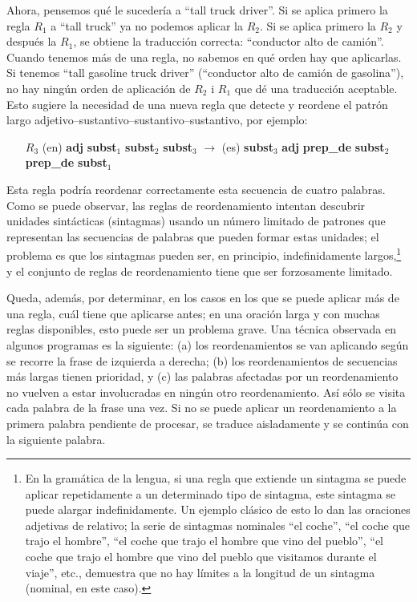 Ahora, pensemos qué le sucedería a ``tall truck driver''. Si se aplica primero la regla $R_1$ a ``tall truck'' ya no podemos aplicar la $R_2$. Si se aplica primero la $R_2$ y después la $R_1$, se obtiene la traducción correcta: ``conductor alto de camión''. Cuando tenemos más de una regla, no sabemos en qué orden hay que aplicarlas. Si tenemos ``tall gasoline truck driver'' (``conductor alto de camión de gasolina''), no hay ningún orden de aplicación de $R_2$ i $R_1$ que dé una traducción aceptable. Esto sugiere la necesidad de una nueva regla que detecte y reordene el patrón largo adjetivo--sustantivo--sustantivo--sustantivo, por ejemplo: \begin{itemize} \item[$R_3$] (en) \textbf{adj} \textbf{subst}$_1$ \textbf{subst}$_2$ \textbf{subst}$_3$ $\rightarrow$ (es) \textbf{subst}$_3$ \textbf{adj} \textbf{prep\_de} \textbf{subst}$_2$ \textbf{prep\_de} \textbf{subst}$_1$ \end{itemize} Esta regla podría reordenar correctamente esta secuencia de cuatro palabras. Como se puede observar, las reglas de reordenamiento intentan descubrir unidades sintácticas (sintagmas) usando un número limitado de patrones que representan las secuencias de palabras que pueden formar estas unidades; el problema es que los sintagmas pueden ser, en principio, indefinidamente largos,\footnote{En la gramática de la lengua, si una regla que extiende un sintagma se puede aplicar repetidamente a un determinado tipo de sintagma, este sintagma se puede alargar indefinidamente. Un ejemplo clásico de esto lo dan las oraciones adjetivas de relativo; la serie de sintagmas nominales ``el coche'', ``el coche que trajo el hombre'', ``el coche que trajo el hombre que vino del pueblo'', ``el coche que trajo el hombre que vino del pueblo que visitamos durante el viaje'', etc., demuestra que no hay límites a la longitud de un sintagma (nominal, en este caso).} y el conjunto de reglas de reordenamiento tiene que ser forzosamente limitado. 

Queda, además, por determinar, en los casos en los que se puede aplicar más de una regla, cuál tiene que aplicarse antes; en una oración larga y con muchas reglas disponibles, esto puede ser un problema grave. Una técnica observada en algunos programas es la siguiente: (a) los reordenamientos se van aplicando según se recorre la frase de izquierda a derecha; (b) los reordenamientos de secuencias más largas tienen prioridad, y (c) las palabras afectadas por un reordenamiento no vuelven a estar involucradas en ningún otro reordenamiento. Así sólo se visita cada palabra de la frase una vez. Si no se puede aplicar un reordenamiento a la primera palabra pendiente de procesar, se traduce aisladamente y se continúa con la siguiente palabra. 

